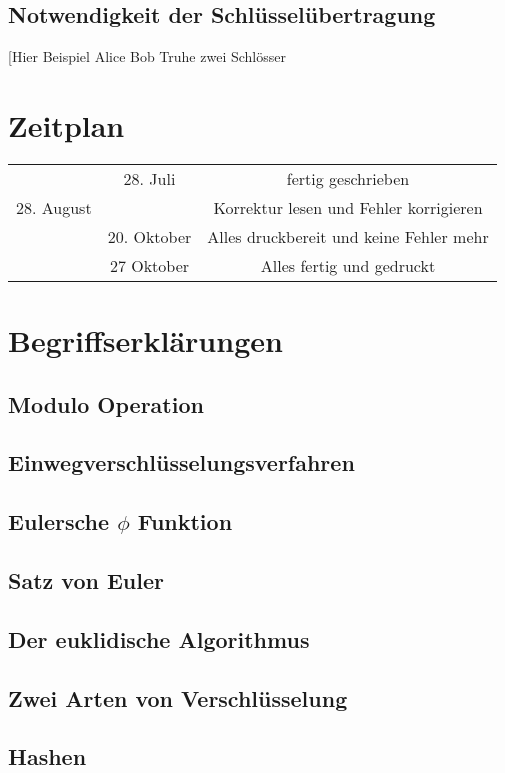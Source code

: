 \documentclass[14pt,a4paper]{scrartcl}
\begin{document}
\subsection{Notwendigkeit der Schlüsselübertragung}
[Hier Beispiel Alice Bob Truhe zwei Schlösser



\section*{Zeitplan}

	\begin{tabular}{ c | c | c }

 & 28. Juli & fertig geschrieben \\
28. August &  & Korrektur lesen und Fehler korrigieren\\
& 20. Oktober & Alles druckbereit und keine Fehler mehr\\
& 27 Oktober & Alles fertig und gedruckt
	\end{tabular}

\section{Begriffserklärungen}
	\subsection{Modulo Operation} %
	\subsection{Einwegverschlüsselungsverfahren}
	\subsection{Eulersche $\phi$ Funktion}
	\subsection{Satz von Euler}
	\subsection{Der euklidische Algorithmus}
	\subsection{Zwei Arten von Verschlüsselung}
	\subsection{Hashen} %
\end{document}
